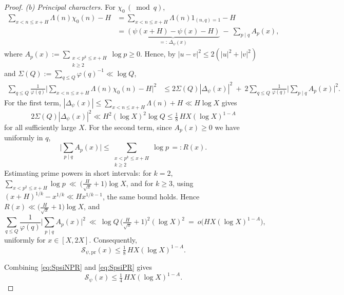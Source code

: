 \documentclass[11pt]{amsart}
\theoremstyle{definition}
\theoremstyle{remark}
\numberwithin{equation}{section}
\begin{document}
\begin{proof}
\emph{(b) Principal characters.}
For $\chi_0\,(\bmod q)$,
\begin{align*}
\sum_{x<n\le x+H}\!\Lambda(n)\chi_0(n)-H&=\sum_{x<n\le x+H}\!\Lambda(n)1_{(n,q)=1}-H\\
&=\underbrace{(\psi(x+H)-\psi(x)-H)}_{=:\,\Delta_{\psi}(x)}\ -\ \sum_{p\mid q}A_p(x),
\end{align*}
where $A_p(x):=\sum\limits_{\substack{x<p^k\le x+H\\ k\ge2}}\!\log p\ge0$. Hence, by $|u-v|^2\le2(|u|^2+|v|^2)$ and $\Sigma(Q):=\sum_{q\le Q}\varphi(q)^{-1}\ll\log Q$,
\begin{align*}
\sum_{q\le Q}\frac1{\varphi(q)}\Big|\sum_{x<n\le x+H}\!\Lambda(n)\chi_0(n)-H\Big|^2
&\le 2\Sigma(Q)|\Delta_{\psi}(x)|^2\ +\ 2\sum_{q\le Q}\frac1{\varphi(q)}\Big|\sum_{p\mid q}A_p(x)\Big|^2.
\end{align*}
For the first term, $|\Delta_{\psi}(x)|\le\sum_{x<n\le x+H}\!\Lambda(n)+H\ll H\log X$ gives
\[
2\Sigma(Q)|\Delta_{\psi}(x)|^2\ll H^2(\log X)^2\log Q\le \tfrac18\,H X(\log X)^{1-A}
\]
for all sufficiently large $X$. For the second term, since $A_p(x)\ge0$ we have uniformly in $q$,
\[
\Big|\sum_{p\mid q}A_p(x)\Big|\le \sum_{\substack{x<p^k\le x+H\\ k\ge2}}\!\log p\,=:R(x).
\]
Estimating prime powers in short intervals: for $k=2$, $\sum_{x<p^2\le x+H}\!\log p\ \ll\ \big(\tfrac{H}{\sqrt x}+1\big)\log X$, and for $k\ge3$, using $(x+H)^{1/k}-x^{1/k}\ll Hx^{1/k-1}$, the same bound holds. Hence $R(x)\ll \big(\tfrac{H}{\sqrt x}+1\big)\log X$, and
\[
\sum_{q\le Q}\frac1{\varphi(q)}\Big|\sum_{p\mid q}A_p(x)\Big|^2\ \ll\ \log Q\,\Big(\tfrac{H}{\sqrt x}+1\Big)^2(\log X)^2\ =\ o\!\big(HX(\log X)^{1-A}\big),
\]
uniformly for $x\in[X,2X]$. Consequently,
\begin{equation}\label{eq:SpsiPR}
\mathcal S_{\psi,\mathrm{pr}}(x)\le \tfrac18\,H X(\log X)^{1-A}.
\end{equation}

Combining \eqref{eq:SpsiNPR} and \eqref{eq:SpsiPR} gives
\begin{equation}\label{eq:SpsiFinal}
\mathcal S_{\psi}(x)\le \tfrac14\,H X(\log X)^{1-A}.
\end{equation}


\end{proof}
\end{document}
